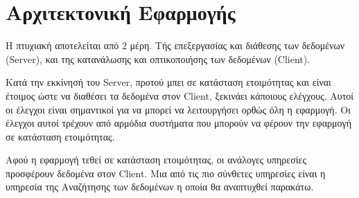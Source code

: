 \chapter{Αρχιτεκτονική Εφαρμογής}
Η πτυχιακή αποτελείται από 2 μέρη. Τής επεξεργασίας και διάθεσης των δεδομένων (Server), και της κατανάλωσης και οπτικοποιήσης των δεδομένων (Client).

Κατά την εκκίνησή του Server, προτού μπει σε κατάσταση ετοιμότητας και είναι έτοιμος
ώστε να διαθέσει τα δεδομένα στον Client, ξεκινάει κάποιους ελέγχους. Αυτοί οι έλεγχοι είναι σημαντικοί για να μπορεί να λειτουργήσει ορθώς όλη η εφαρμογή. Οι έλεγχοι αυτοί τρέχουν από αρμόδια συστήματα που μπορούν να φέρουν την εφαρμογή σε κατάσταση ετοιμότητας. 

Αφού η εφαρμογή τεθεί σε κατάσταση ετοιμότητας, οι ανάλογες υπηρεσίες προσφέρουν δεδομένα στον Client. Μια από τις πιο σύνθετες υπηρεσίες είναι η υπηρεσία της Αναζήτησης των δεδομένων η οποία θα αναπτυχθεί παρακάτω. 




